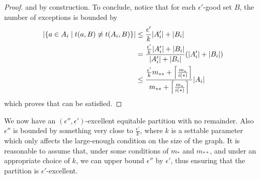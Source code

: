 \begin{lemma}[Claim 5.14.2]
\begin{proof}
             and
             by construction.
            To conclude, notice that for each $\epsilon'$-good set $B$, the number of exceptions is bounded by
            \begin{align*}
                | \{ a \in A_i \mid t(a, B) \not\equiv t(A_i, B) \} |
                    & \leq \frac{\epsilon'}{k} | A_i' | + | B_i | \\
                    & = \frac{\frac{\epsilon'}{k} | A_i' | + | B_i |}{| A_i' | + | B_i |}
                        ( | A_i' | + | B_i | ) \\
                    & \leq \frac{\frac{\epsilon'}{k} m_{**} + \left\lceil \frac{m_*}{i(*)} \right\rceil}{m_{**} + \left\lceil \frac{m_*}{i(*)} \right\rceil}
                        | A_i |
            \end{align*}
            which proves that  can be satisfied.
        \end{proof}
    \end{lemma}

    We now have an $(\epsilon'', \epsilon')$-excellent equitable partition with no remainder.
    Also $\epsilon''$ is bounded by something very close to $\frac{\epsilon'}{k}$, where $k$ is a settable parameter
    which only affects the large-enough condition on the size of the graph.
    It is reasonable to assume that, under some conditions of $m_*$ and $m_{**}$, and under an appropriate choice of $k$,
    we can upper bound $\epsilon''$ by $\epsilon'$, thus ensuring that the partition is $\epsilon'$-excellent.


